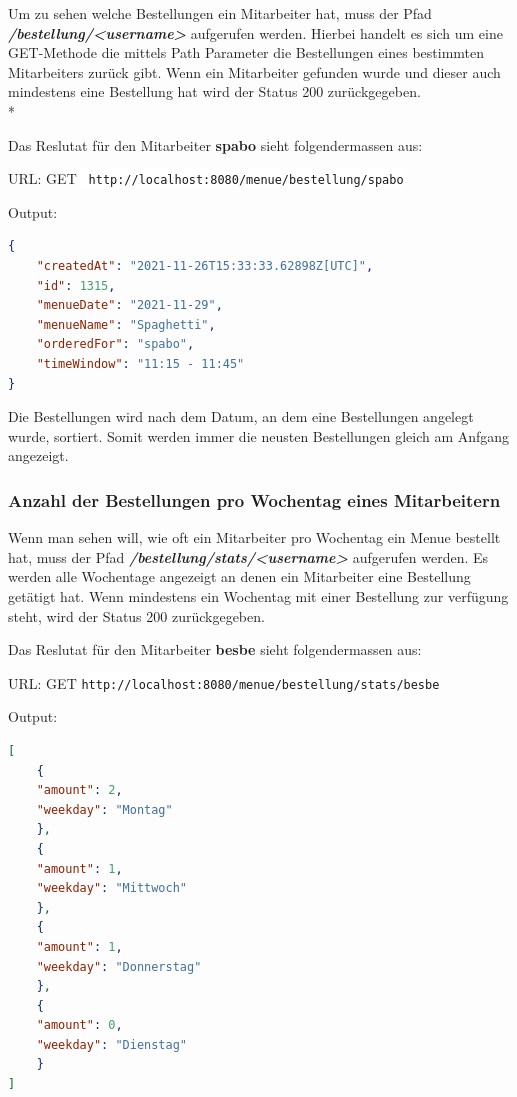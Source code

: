 Um zu sehen welche Bestellungen ein Mitarbeiter hat, muss der Pfad \textbf{\textit{/bestellung/<username>}} aufgerufen werden. 
Hierbei handelt es sich um eine GET-Methode die mittels Path Parameter die Bestellungen eines bestimmten Mitarbeiters zurück gibt.
Wenn ein Mitarbeiter gefunden wurde und dieser auch mindestens eine Bestellung hat wird der Status 200 zurückgegeben. \\*

Das Reslutat für den Mitarbeiter \textbf{spabo} sieht folgendermassen aus:


URL: GET \colorbox{white}{\lstinline[basicstyle=\ttfamily\color{black},language=html]| http://localhost:8080/menue/bestellung/spabo|}


Output:

\begin{lstlisting}[language=json,firstnumber=1]
{
    "createdAt": "2021-11-26T15:33:33.62898Z[UTC]",
    "id": 1315,
    "menueDate": "2021-11-29",
    "menueName": "Spaghetti",
    "orderedFor": "spabo",
    "timeWindow": "11:15 - 11:45"
}
\end{lstlisting}

Die Bestellungen wird nach dem Datum, an dem eine Bestellungen angelegt wurde, sortiert. Somit werden immer die neusten Bestellungen gleich am Anfgang angezeigt.

\pagebreak

\subsubsection{Anzahl der Bestellungen pro Wochentag eines Mitarbeitern}

Wenn man sehen will, wie oft ein Mitarbeiter pro Wochentag ein Menue bestellt hat, muss der Pfad \textbf{\textit{/bestellung/stats/<username>}} aufgerufen werden.
Es werden alle Wochentage angezeigt an denen ein Mitarbeiter eine Bestellung getätigt hat. Wenn mindestens ein Wochentag mit einer Bestellung zur verfügung steht, 
wird der Status 200 zurückgegeben.

Das Reslutat für den Mitarbeiter \textbf{besbe} sieht folgendermassen aus:


URL: GET \colorbox{white}{\lstinline[basicstyle=\ttfamily\color{black},language=html]|http://localhost:8080/menue/bestellung/stats/besbe|}


Output:

\begin{lstlisting}[language=json,firstnumber=1]
[
    {
    "amount": 2,
    "weekday": "Montag"
    },
    {
    "amount": 1,
    "weekday": "Mittwoch"
    },
    {
    "amount": 1,
    "weekday": "Donnerstag"
    },
    {
    "amount": 0,
    "weekday": "Dienstag"
    }
]
\end{lstlisting}

